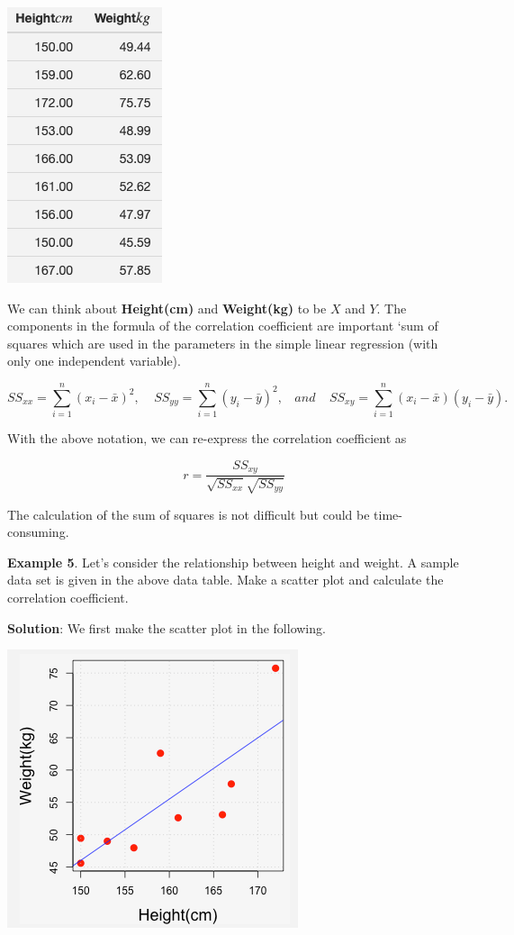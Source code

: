 \documentclass[
]{book}
\begin{document}
\begin{center}\includegraphics[width=0.5\linewidth]{week12/correlationData} \end{center}

We can think about \textbf{Height(cm)} and \textbf{Weight(kg)} to be \(X\) and \(Y\). The components in the formula of the correlation coefficient are important `sum of squares which are used in the parameters in the simple linear regression (with only one independent variable).

\[
SS_{xx} = \sum_{i=1}^n(x_i-\bar{x})^2, \ \  \  \  \ SS_{yy} = \sum_{i=1}^n(y_i-\bar{y})^2, \ \ \ \ and \  \  \  \  \   SS_{xy} = \sum_{i=1}^n(x_i-\bar{x})(y_i-\bar{y}). 
\]

With the above notation, we can re-express the correlation coefficient as

\[
r = \frac{SS_{xy}}{\sqrt{SS_{xx}}\sqrt{SS_{yy}}}
\]

The calculation of the sum of squares is not difficult but could be time-consuming.

\textbf{Example 5}. Let's consider the relationship between height and weight. A sample data set is given in the above data table. Make a scatter plot and calculate the correlation coefficient.

\textbf{Solution}: We first make the scatter plot in the following.

\begin{center}\includegraphics[width=0.5\linewidth]{week12/example05} \end{center}
\end{document}
